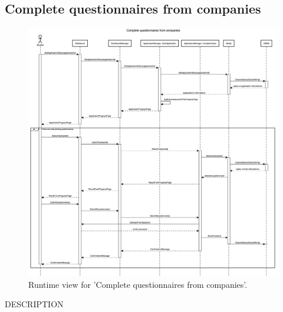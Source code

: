 \subsection{Complete questionnaires from companies}
\begin{figure}[H]
    \begin{center}
        \includegraphics[width=0.8\linewidth]{DD/LaTeX/Images/RuntimeView/CompleteQuestionnaires.png}
        \caption{Runtime view for 'Complete questionnaires from companies'.}
        \label{fig:runtime_CompleteQuestionnaires}%
    \end{center}
\end{figure}

DESCRIPTION


